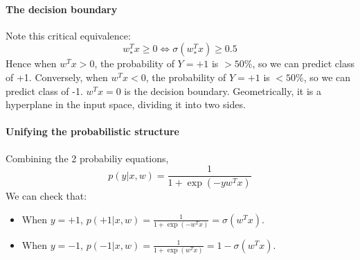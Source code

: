\documentclass[../Probability.tex]{subfiles}
\begin{document}
\paragraph{The decision boundary} Note this critical equivalence:
$$w_*^T x \ge 0 \Leftrightarrow \sigma(w_*^T x) \ge 0.5$$
Hence when $w^T x > 0$, the probability of $Y = +1$ is $> 50\%$, so we can predict class of +1.\newline
Conversely, when $w^T x < 0$, the probability of $Y = +1$ is $< 50\%$, so we can predict class of -1.\newline
$w^T x = 0$ is the decision boundary. Geometrically, it is a hyperplane in the input space, dividing it into two sides.
\paragraph{Unifying the probabilistic structure} Combining the 2 probabiliy equations, 
$$p(y|x,w) = \frac{1}{1 + \exp(-y w^T x)}$$
We can check that:
\begin{itemize}
    \item When $y=+1$, $p(+1|x,w) = \frac{1}{1 + \exp(-w^T x)} = \sigma(w^Tx)$.
    \item When $y=-1$, $p(-1|x,w) = \frac{1}{1 + \exp(w^T x)} = 1 - \sigma(w^Tx)$.
\end{itemize}
\end{document}

